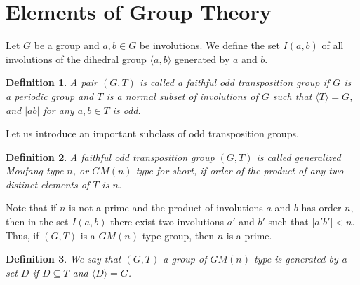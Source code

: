 \documentclass[12pt]{article}
\newcommand\la{\langle}
\newcommand\ra{\rangle}
\newtheorem{defi}{Definition}
\begin{document}
	
		
\section{Elements of Group Theory}

Let $G$ be a group and $a,b\in G$ be involutions. We define the set $I(a,b)$ of all involutions of the dihedral group $\la a,b\ra$ generated by $a$ and $b$.

\begin{defi}
	A pair $(G,T)$ is called a faithful odd transposition group if $G$ is a periodic group and $T$ is a normal subset of involutions of $G$ such that $\la T\ra=G$, and $|ab|$ for any $a,b\in T$ is odd.
	\end{defi}
	
Let us introduce an important subclass of odd transposition groups.		
	\begin{defi}
		A faithful odd transposition group $(G,T)$ is called generalized Moufang type $n$, or $GM(n)$-type for short, if order of the product of any two distinct elements of $T$ is $n$.
	\end{defi}	

Note that if $n$ is not a prime and the product of involutions $a$ and $b$ has order $n$, then in the set $I(a,b)$ there exist two involutions $a'$ and $b'$ such that $|a'b'|<n$. Thus, if $(G,T)$ is a $GM(n)$-type group, then $n$ is a prime.
	
	\begin{defi}
We say that $(G,T)$ a group of $GM(n)$-type is generated by a set $D$ if $D\subseteq T$ and $\la D\ra=G$.
	\end{defi}
	
\end{document}
